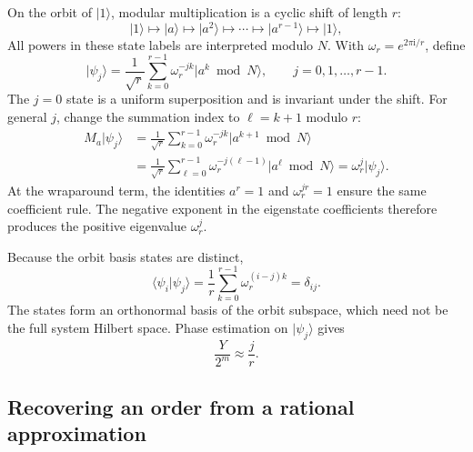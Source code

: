 \documentclass[11pt,oneside,openany]{book}
\providecommand{\ket}{}
\renewcommand{\ket}[1]{\lvert #1\rangle}
\providecommand{\braket}{}
\renewcommand{\braket}[2]{\langle #1\vert #2\rangle}
\newcommand{\ii}{\mathrm{i}}
\theoremstyle{definition}
\begin{document}
On the orbit of $\ket1$, modular multiplication is a cyclic shift of length $r$:
\begin{equation}
 \ket1\longmapsto\ket a\longmapsto\ket{a^2}\longmapsto\cdots
 \longmapsto\ket{a^{r-1}}\longmapsto\ket1,
\end{equation}
All powers in these state labels are interpreted modulo $N$. With $\omega_r=e^{2\pi\ii/r}$, define
\begin{equation}
 \ket{\psi_j}=\frac1{\sqrt r}\sum_{k=0}^{r-1}\omega_r^{-jk}\ket{a^k\bmod N},
 \qquad j=0,1,\ldots,r-1.
 \label{eq:phase:ordereigenstates}
\end{equation}
The $j=0$ state is a uniform superposition and is invariant under the shift. For general $j$, change the summation index to $\ell=k+1$ modulo $r$:
\begin{align}
 M_a\ket{\psi_j}
 &=\frac1{\sqrt r}\sum_{k=0}^{r-1}\omega_r^{-jk}\ket{a^{k+1}\bmod N}\\
 &=\frac1{\sqrt r}\sum_{\ell=0}^{r-1}\omega_r^{-j(\ell-1)}\ket{a^{\ell}\bmod N}
 =\omega_r^j\ket{\psi_j}.
 \label{eq:phase:ordereigenvalue}
\end{align}
At the wraparound term, the identities $a^r=1$ and $\omega_r^{jr}=1$ ensure the same coefficient rule. The negative exponent in the eigenstate coefficients therefore produces the positive eigenvalue $\omega_r^j$.

Because the orbit basis states are distinct,
\begin{equation}
 \braket{\psi_i}{\psi_j}=\frac1r\sum_{k=0}^{r-1}\omega_r^{(i-j)k}=\delta_{ij}.
\end{equation}
The states form an orthonormal basis of the orbit subspace, which need not be the full system Hilbert space. Phase estimation on $\ket{\psi_j}$ gives
\begin{equation}
 \frac{Y}{2^m}\approx\frac jr.
 \label{eq:phase:orderphase}
\end{equation}

\subsection{Recovering an order from a rational approximation}
\end{document}
